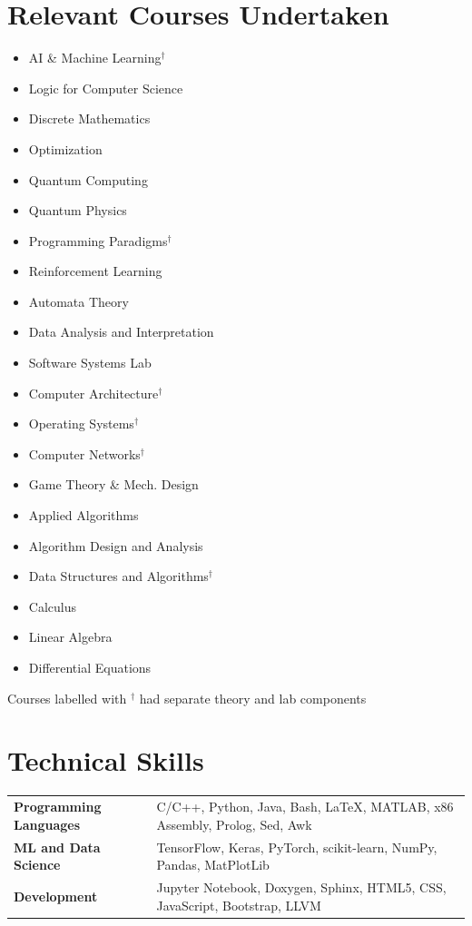 \documentclass[11pt,letterpaper,sans]{moderncv}
\begin{document}
\section{Relevant Courses Undertaken}
\vspace*{-1em}
\begin{multicols}{3}
\begin{itemize}
  \item AI \& Machine Learning$^{\dag}$
  \item Logic for Computer Science
  \item Discrete Mathematics
  \item Optimization
  \item Quantum Computing
  \item Quantum Physics
  \item Programming Paradigms$^{\dag}$
  \item Reinforcement Learning
  \item Automata Theory
  \item Data Analysis and Interpretation
  \item Software Systems Lab
  \item Computer Architecture$^{\dag}$
  \item Operating Systems$^{\dag}$
  \item Computer Networks$^{\dag}$
  \item Game Theory \& Mech. Design
  \item Applied Algorithms
  \item Algorithm Design and Analysis
  \item Data Structures and Algorithms$^{\dag}$
  \item Calculus
  \item Linear Algebra
  \item Differential Equations
\end{itemize}
\end{multicols}
\vspace*{-6mm}
\begin{flushright}
  Courses labelled with $^{\dag}$ had separate theory and lab components
\end{flushright}
\vspace*{-6mm}
\section{Technical Skills}
\begin{tabularx}{\textwidth}{ l | l }
	\textbf{Programming Languages  } & \quad C/C++, Python, Java, Bash, \LaTeX, MATLAB, x86 Assembly, Prolog, Sed, Awk\\
        \textbf{ML and Data Science  } & \quad TensorFlow, Keras, PyTorch, scikit-learn, NumPy, Pandas, MatPlotLib\\
        \textbf{Development  } & \quad Jupyter Notebook, Doxygen, Sphinx, HTML5, CSS, JavaScript, Bootstrap, LLVM\\
\end{tabularx}
\end{document}
